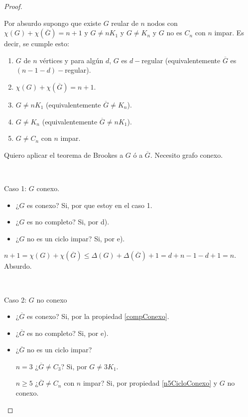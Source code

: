 \begin{proof}

	~

	Por absurdo supongo que existe $G$ reular de $n$ nodos con $\chi(G) + \chi(\overline{G}) = n + 1$ y $G \not= n K_1$ y $G \not= K_n$ y $G$ no es $C_n$ con $n$ impar. Es decir, se cumple esto:

	\begin{enumerate}[label=\alph*)]
		\item $G$ de $n$ vértices y para algún $d$, $G$ es $d-$regular (equivalentemente $\overline{G}$ es $(n - 1 - d)-$regular).
		\item $\chi(G) + \chi(\overline{G}) = n + 1$.
		\item $G \not= n K_1$ (equivalentemente $\overline{G} \not= K_n$).
		\item $G \not= K_n$ (equivalentemente $\overline{G} \not= n K_1$).
		\item $G \not= C_n$ con $n$ impar.
	\end{enumerate}

	Quiero aplicar el teorema de Brookes a $G$ ó a $\overline{G}$. Necesito grafo conexo.

	~

	Caso 1: $G$ conexo.

	\begin{itemize}
		\item ¿$G$ es conexo? Si, por que estoy en el caso 1.
		\item ¿$G$ es no completo? Si, por d).
		\item ¿$G$ no es un ciclo impar? Si, por e).
	\end{itemize}

	$n + 1 = \chi(G) + \chi(\overline{G}) \leq \Delta(G) + \Delta(\overline{G}) + 1 = d + n - 1 - d + 1 = n$. Absurdo.

	~

	Caso 2: $G$ no conexo

	\begin{itemize}
		\item ¿$\overline{G}$ es conexo? Si, por la propiedad \ref{compConexo}.
		\item ¿$\overline{G}$ es no completo? Si, por e).
		\item {
			¿$\overline{G}$ no es un ciclo impar?

			$n = 3$ ¿$\overline{G} \not= C_3$? Si, por $G \not= 3 K_1$.

			$n \geq 5$ ¿$\overline{G} \not= C_n$ con $n$ impar? Si, por propiedad \ref{n5CicloConexo} y $G$ no conexo.
		}
	\end{itemize}
\end{proof}